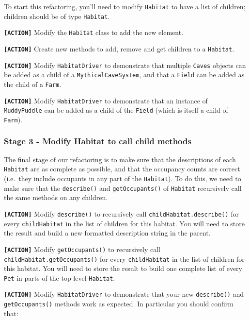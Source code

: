 \documentclass[
]{book}
\begin{document}
To start this refactoring, you'll need to modify \texttt{Habitat} to have a list of children; children should be of type \texttt{Habitat}.

\textbf{\texttt{{[}ACTION{]}}} Modify the \texttt{Habitat} class to add the new element.

\textbf{\texttt{{[}ACTION{]}}} Create new methods to add, remove and get children to a \texttt{Habitat}.

\textbf{\texttt{{[}ACTION{]}}} Modify \texttt{HabitatDriver} to demonstrate that multiple \texttt{Caves} objects can be added as a child of a \texttt{MythicalCaveSystem}, and that a \texttt{Field} can be added as the child of a \texttt{Farm}.

\textbf{\texttt{{[}ACTION{]}}} Modify \texttt{HabitatDriver} to demonstrate that an instance of \texttt{MuddyPuddle} can be added as a child of the \texttt{Field} (which is itself a child of \texttt{Farm}).

\hypertarget{childmethods}{%
\subsubsection{Stage 3 - Modify Habitat to call child methods}\label{childmethods}}

The final stage of our refactoring is to make sure that the descriptions of each \texttt{Habitat} are as complete as possible, and that the occupancy counts are correct (i.e.~they include occupants in any part of the \texttt{Habitat}). To do this, we need to make sure that the \texttt{describe()} and \texttt{getOccupants()} of \texttt{Habitat} recursively call the same methods on any children.

\textbf{\texttt{{[}ACTION{]}}} Modify \texttt{describe()} to recursively call \texttt{childHabitat.describe()} for every \texttt{childHabitat} in the list of children for this habitat. You will need to store the result and build a new formatted description string in the parent.

\textbf{\texttt{{[}ACTION{]}}} Modify \texttt{getOccupants()} to recursively call \texttt{childHabitat.getOccupants()} for every \texttt{childHabitat} in the list of children for this habitat. You will need to store the result to build one complete list of every \texttt{Pet} in parts of the top-level \texttt{Habitat}.

\textbf{\texttt{{[}ACTION{]}}} Modify \texttt{HabitatDriver} to demonstrate that your new \texttt{describe()} and \texttt{getOccupants()} methods work as expected. In particular you should confirm that:
\end{document}
